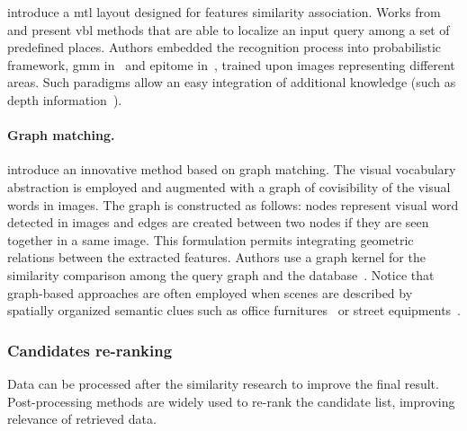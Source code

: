 \citet{Lu2015} introduce a \ac{mtl} layout designed for features similarity association. Works from \citet{torralba2003context} and \citet{Ni2009} present \ac{vbl} methods that are able to localize an input query among a set of predefined places. Authors embedded the recognition process into probabilistic framework, \ac{gmm} in~\citep{torralba2003context} and epitome in~\citep{Ni2009}, trained upon images representing different areas. Such paradigms allow an easy integration of additional knowledge (such as depth information~\citep{Ni2009}).

\paragraph{Graph matching.}
\citet{Stumm2015a} introduce an innovative method based on graph matching. The visual vocabulary abstraction is employed and augmented with a graph of covisibility of the visual words in images. The graph is constructed as follows: nodes represent visual word detected in images and edges are created between two nodes if they are seen together in a same image. This formulation permits integrating geometric relations between the extracted features. Authors use a graph kernel for the similarity comparison among the query graph and the database~\citep{Stumm2015,Stumm2016}. Notice that graph-based approaches are often employed when scenes are described by spatially organized semantic clues such as office furnitures~\citep{Salas-Moreno2013} or street equipments~\citep{Ardeshir2014}.

\subsubsection{Candidates re-ranking}
\label{subsec:candidates_re_ranking}
Data can be processed after the similarity research to improve the final result. Post-processing methods are widely used to re-rank the candidate list, improving relevance of retrieved data.

